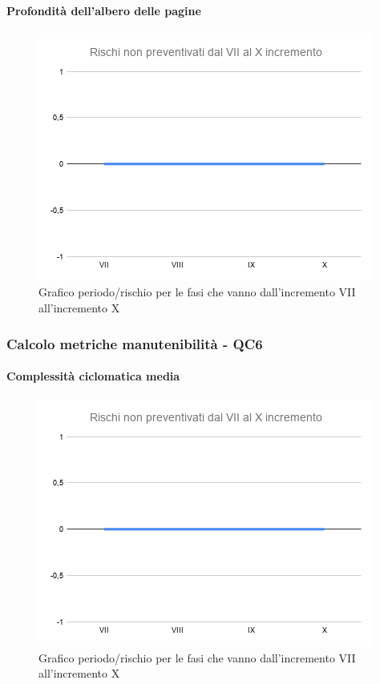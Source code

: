 \paragraph{Profondità dell’albero delle pagine}
\begin{figure}[H]
			\centering%
			\includegraphics[width=0.8\linewidth]{./res/images/RischiNonPreven_4.png}
			\caption{Grafico periodo/rischio per le fasi che vanno dall'incremento VII all'incremento X}
			\label{fig:Grafico periodo/rischio per le fasi che vanno dall'incremento VII all'incremento X}
	\end{figure}

\subsubsection{Calcolo metriche manutenibilità - QC6}
\paragraph{Complessità ciclomatica media}
\begin{figure}[H]
			\centering%
			\includegraphics[width=0.8\linewidth]{./res/images/RischiNonPreven_4.png}
			\caption{Grafico periodo/rischio per le fasi che vanno dall'incremento VII all'incremento X}
			\label{fig:Grafico periodo/rischio per le fasi che vanno dall'incremento VII all'incremento X}
	\end{figure}
